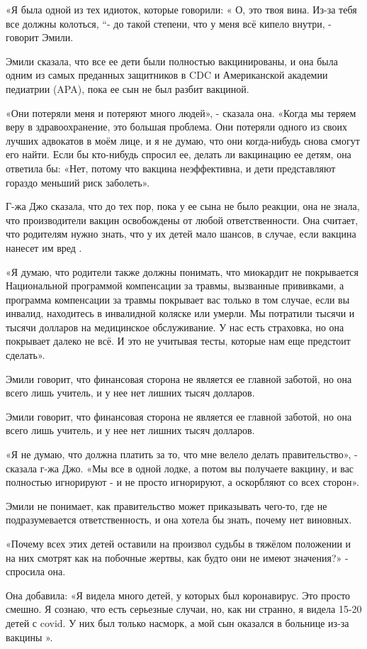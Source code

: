 {«Я была одной из тех идиоток, которые говорили: « О, это твоя вина. Из-за тебя
все должны колоться, “- до такой степени, что у меня всё кипело внутри, -
говорит Эмили.

Эмили сказала, что все ее дети были полностью вакцинированы, и она была одним из
самых преданных защитников в CDC и Американской академии педиатрии (APA), пока
ее сын не был разбит вакциной.

«Они потеряли меня и потеряют много людей», - сказала она. «Когда мы теряем веру
в здравоохранение, это большая проблема. Они потеряли одного из своих лучших
адвокатов в моём лице, и я не думаю, что они когда-нибудь снова смогут его
найти. Если бы кто-нибудь спросил ее, делать ли вакцинацию ее детям, она
ответила бы: «Нет, потому что вакцина неэффективна, и дети представляют гораздо
меньший риск заболеть».

Г-жа Джо сказала, что до тех пор, пока у ее сына не было реакции, она не знала,
что производители вакцин освобождены от любой ответственности. Она считает, что
родителям нужно знать, что у их детей мало шансов, в случае, если вакцина
нанесет им вред .

«Я думаю, что родители также должны понимать, что миокардит не покрывается
Национальной программой компенсации за травмы, вызванные прививками, а программа
компенсации за травмы покрывает вас только в том случае, если вы инвалид,
находитесь в инвалидной коляске или умерли. Мы потратили тысячи и тысячи
долларов на медицинское обслуживание. У нас есть страховка, но она покрывает
далеко не всё. И это не учитывая тесты, которые нам еще предстоит сделать».

Эмили говорит, что финансовая сторона не является ее главной заботой, но она
всего лишь учитель, и у нее нет лишних тысяч долларов.

Эмили говорит, что финансовая сторона не является ее главной заботой, но она
всего лишь учитель, и у нее нет лишних тысяч долларов.

«Я не думаю, что должна платить за то, что мне велело делать правительство», -
сказала г-жа Джо. «Мы все в одной лодке, а потом вы получаете вакцину, и вас
полностью игнорируют - и не просто игнорируют, а оскорбляют со всех сторон».

Эмили не понимает, как правительство может приказывать чего-то, где не подразумевается ответственность, и она хотела бы знать, почему нет виновных.

«Почему всех этих детей оставили на произвол судьбы в тяжёлом положении и на них
смотрят как на побочные жертвы, как будто они не имеют значения?» - спросила
она.

Она добавила: «Я видела много детей, у которых был коронавирус. Это просто
смешно. Я сознаю, что есть серьезные случаи, но, как ни странно, я видела 15-20
детей с covid. У них был только насморк, а мой сын оказался в больнице из-за
вакцины ».

}
